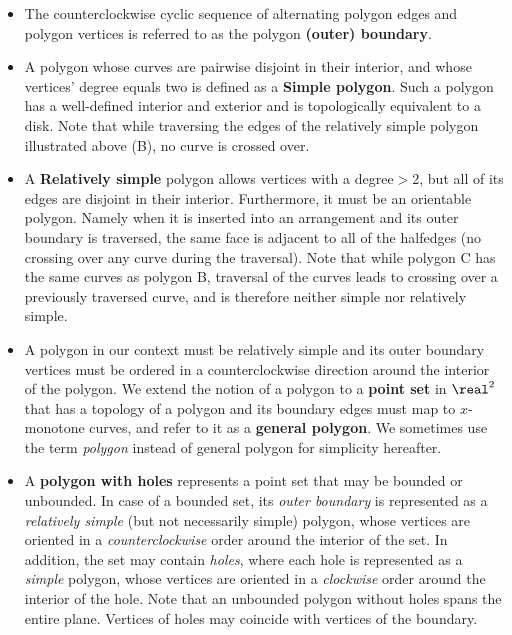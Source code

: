 \begin{itemize}

\item The counterclockwise cyclic sequence of alternating polygon edges and
polygon vertices is referred to as the polygon \textbf{(outer) boundary}.

\item A polygon whose curves are pairwise disjoint in their interior, and whose vertices' degree equals two is defined as a \textbf{Simple polygon}. Such a polygon has a well-defined interior and exterior and is topologically equivalent to a disk.  Note that while traversing the edges of the relatively simple polygon illustrated above (B), no curve is crossed over.

\item A \textbf{Relatively simple} polygon allows vertices with a degree$>$2, but all of its edges are disjoint in their interior. Furthermore, it must be an orientable polygon.  Namely when it is inserted into an arrangement and its outer boundary is traversed, the same face is adjacent to all of the halfedges (no crossing over any curve during the traversal).  
Note that while polygon C has the same curves as polygon B, traversal of the curves leads to crossing over a previously traversed curve, and is therefore neither simple nor relatively simple.  

\item A polygon in our context must be relatively simple and its outer boundary vertices must be ordered in a counterclockwise direction around the interior of the polygon.
We extend the notion of a polygon to a \textbf{point set} in $\real^2$
that has  a topology of a polygon and its boundary edges must map to
$x$-monotone curves, and refer to it as a \textbf{general polygon}. We
sometimes use the term {\em polygon} instead of general polygon for
simplicity hereafter.

\item A \textbf{polygon with holes} represents a point set that may
be bounded or unbounded. In case of a bounded set, its {\em outer
boundary} is represented as a {\em relatively simple } (but not necessarily simple) polygon, whose vertices are oriented in a {\em counterclockwise }
order around the interior of the set. In addition, the set may contain
{\em holes}, where each hole is represented as a {\em simple}
polygon, whose vertices are oriented in a {\em clockwise} order around the
interior of the hole. Note that an unbounded polygon without holes
spans the entire plane. Vertices of holes may coincide with vertices
of the boundary.


\end{itemize}
